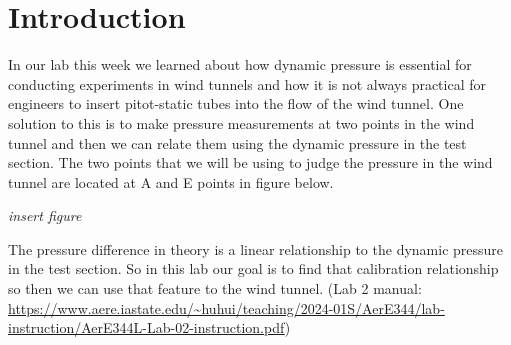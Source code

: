\chapter{Introduction}
\label{cp:introduction}
In our lab this week we learned about how dynamic pressure is essential for conducting experiments in wind tunnels and how it is not always practical for engineers to insert pitot-static tubes into the flow of the wind tunnel. One solution to this is to make pressure measurements at two points in the wind tunnel and then we can relate them using the dynamic pressure in the test section. The two points that we will be using to judge the pressure in the wind tunnel are located at A and E points in figure below.  

{\it insert figure}

The pressure difference in theory is a linear relationship to the dynamic pressure in the test section. So in this lab our goal is to find that calibration relationship so then we can use that feature to the wind tunnel. (Lab 2 manual: \url{https://www.aere.iastate.edu/~huhui/teaching/2024-01S/AerE344/lab-instruction/AerE344L-Lab-02-instruction.pdf}) 